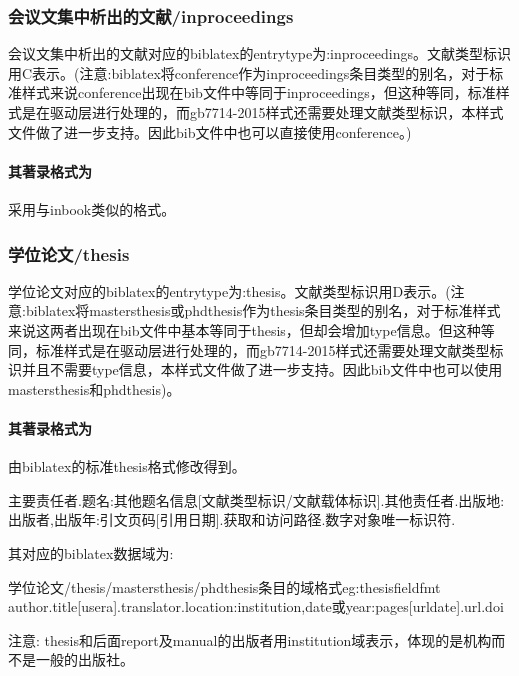 \subsubsection{会议文集中析出的文献/inproceedings}
\begin{refentry}{}{}
会议文集中析出的文献对应的biblatex的entrytype为:inproceedings。文献类型标识用C表示。(注意:biblatex将conference作为inproceedings条目类型的别名，对于标准样式来说conference出现在bib文件中等同于inproceedings，但这种等同，标准样式是在驱动层进行处理的，而gb7714-2015样式还需要处理文献类型标识，本样式文件做了进一步支持。因此bib文件中也可以直接使用conference。)

\paragraph{其著录格式为} 采用与inbook类似的格式。
\end{refentry}

\subsubsection{学位论文/thesis}
\begin{refentry}{}{}
学位论文对应的biblatex的entrytype为:thesis。文献类型标识用D表示。(注意:biblatex将mastersthesis或phdthesis作为thesis条目类型的别名，对于标准样式来说这两者出现在bib文件中基本等同于thesis，但却会增加type信息。但这种等同，标准样式是在驱动层进行处理的，而gb7714-2015样式还需要处理文献类型标识并且不需要type信息，本样式文件做了进一步支持。因此bib文件中也可以使用mastersthesis和phdthesis)。

\paragraph{其著录格式为} 由biblatex的标准thesis格式修改得到。

主要责任者.题名:其他题名信息[文献类型标识/文献载体标识].其他责任者.出版地:出版者,出版年:引文页码[引用日期].获取和访问路径.数字对象唯一标识符.
\end{refentry}

其对应的biblatex数据域为:
\begin{codetex}{学位论文/thesis/mastersthesis/phdthesis条目的域格式}{eg:thesisfieldfmt}
author.title[usera].translator.location:institution,date或year:pages[urldate].url.doi
\end{codetex}

注意: thesis和后面report及manual的出版者用institution域表示，体现的是机构而不是一般的出版社。

